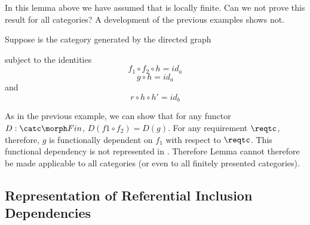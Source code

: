 In this lemma above we have assumed that \catcw is locally finite. Can we not prove this result for all categories? A development of the previous examples shows not.
\begin{example}
Suppose \catcw is the category generated by the directed graph

subject to the identities
\begin{equation}
\label{fdcounterfhidentity}
f_1 \circ f_2 \circ h = id_a
\end{equation}
\begin{equation}
\label{fdcounterghidentity}
g \circ h = id_a
\end{equation}
and 
\begin{equation}
\label{fdcounterrhhpidentity}
r \circ h \circ h' = id_b
\end{equation}

As in the previous example, we can show that for any functor $D:\catc \morph Fin$, $D(f1 \circ f_2)=D(g)$. For any requirement 
$\reqtc$, therefore,  $g$ is functionally dependent on $f_1$ 
with respect to $\reqtc$. This functional dependency  
is not represented in \catc.
Therefore Lemma  cannot therefore be made applicable to all categories (or even to all finitely presented categories).
\end{example}

\subsection{Representation of Referential Inclusion Dependencies}

